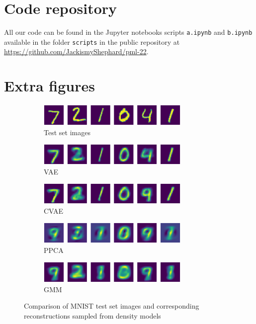 
\section{Code repository}
All our code can be found in the Jupyter notebooks scripts \texttt{a.ipynb} and \texttt{b.ipynb} available in the folder \texttt{scripts} in the public repository at
\url{https://github.com/JackismyShephard/pml-22}.

\section{Extra figures}
\begin{figure}[!h]
	\begin{subfigure}[t]{1\textwidth}
		\centering
		\includegraphics[width = 0.8\textwidth]{figures/ppca/real}
		\caption{Test set images}
	\end{subfigure}
	\begin{subfigure}[t]{1\textwidth}
		\centering
		\includegraphics[width = 0.8\textwidth]{figures/vae/mean}
		\caption{VAE}
	\end{subfigure}
	\begin{subfigure}[t]{1\textwidth}
		\centering
		\includegraphics[width = 0.8\textwidth]{figures/cvae/mean}
		\caption{CVAE}
	\end{subfigure}
	\begin{subfigure}[t]{1\textwidth}
		\centering
		\includegraphics[width = 0.8\textwidth]{figures/ppca/mean}
		\caption{PPCA}
	\end{subfigure}
	\begin{subfigure}[t]{1\textwidth}
		\centering
		\includegraphics[width = 0.8\textwidth]{figures/gmm/mean}
		\caption{GMM}
	\end{subfigure}
	\caption{Comparison of MNIST test set images and corresponding reconstructions sampled from density models}
\end{figure}

